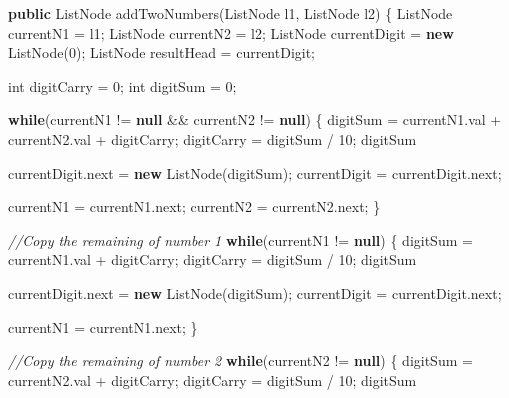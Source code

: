 \documentclass[]{book}
\newenvironment{Shaded}{\begin{snugshade}}{\end{snugshade}}
\newcommand{\CommentTok}[1]{\textcolor[rgb]{0.56,0.35,0.01}{\textit{#1}}}
\newcommand{\DataTypeTok}[1]{\textcolor[rgb]{0.13,0.29,0.53}{#1}}
\newcommand{\DecValTok}[1]{\textcolor[rgb]{0.00,0.00,0.81}{#1}}
\newcommand{\FunctionTok}[1]{\textcolor[rgb]{0.00,0.00,0.00}{#1}}
\newcommand{\KeywordTok}[1]{\textcolor[rgb]{0.13,0.29,0.53}{\textbf{#1}}}
\newcommand{\NormalTok}[1]{#1}
\begin{document}
\begin{Shaded}
\begin{Highlighting}[]
\KeywordTok{public}\NormalTok{ ListNode }\FunctionTok{addTwoNumbers}\NormalTok{(ListNode l1, ListNode l2) \{}
\NormalTok{    ListNode currentN1 = l1;}
\NormalTok{    ListNode currentN2 = l2;}
\NormalTok{    ListNode currentDigit = }\KeywordTok{new} \FunctionTok{ListNode}\NormalTok{(}\DecValTok{0}\NormalTok{);}
\NormalTok{    ListNode resultHead = currentDigit;}

    \DataTypeTok{int}\NormalTok{ digitCarry = }\DecValTok{0}\NormalTok{;}
    \DataTypeTok{int}\NormalTok{ digitSum = }\DecValTok{0}\NormalTok{;}

    \KeywordTok{while}\NormalTok{(currentN1 != }\KeywordTok{null}\NormalTok{ && currentN2 != }\KeywordTok{null}\NormalTok{) \{}
\NormalTok{        digitSum = currentN1.}\FunctionTok{val}\NormalTok{ + currentN2.}\FunctionTok{val}\NormalTok{ + digitCarry;}
\NormalTok{        digitCarry = digitSum / }\DecValTok{10}\NormalTok{;}
\NormalTok{        digitSum %

\NormalTok{        currentDigit.}\FunctionTok{next}\NormalTok{ = }\KeywordTok{new} \FunctionTok{ListNode}\NormalTok{(digitSum);}
\NormalTok{        currentDigit = currentDigit.}\FunctionTok{next}\NormalTok{;}

\NormalTok{        currentN1 = currentN1.}\FunctionTok{next}\NormalTok{;}
\NormalTok{        currentN2 = currentN2.}\FunctionTok{next}\NormalTok{;}
\NormalTok{    \}}

    \CommentTok{//Copy the remaining of number 1}
    \KeywordTok{while}\NormalTok{(currentN1 != }\KeywordTok{null}\NormalTok{) \{}
\NormalTok{        digitSum = currentN1.}\FunctionTok{val}\NormalTok{ + digitCarry;}
\NormalTok{        digitCarry = digitSum / }\DecValTok{10}\NormalTok{;}
\NormalTok{        digitSum %

\NormalTok{        currentDigit.}\FunctionTok{next}\NormalTok{ = }\KeywordTok{new} \FunctionTok{ListNode}\NormalTok{(digitSum);}
\NormalTok{        currentDigit = currentDigit.}\FunctionTok{next}\NormalTok{;}

\NormalTok{        currentN1 = currentN1.}\FunctionTok{next}\NormalTok{;}
\NormalTok{    \}}

    \CommentTok{//Copy the remaining of number 2}
    \KeywordTok{while}\NormalTok{(currentN2 != }\KeywordTok{null}\NormalTok{) \{}
\NormalTok{        digitSum = currentN2.}\FunctionTok{val}\NormalTok{ + digitCarry;}
\NormalTok{        digitCarry = digitSum / }\DecValTok{10}\NormalTok{;}
\NormalTok{        digitSum %

}}}
\end{Highlighting}
\end{Shaded}
\end{document}

